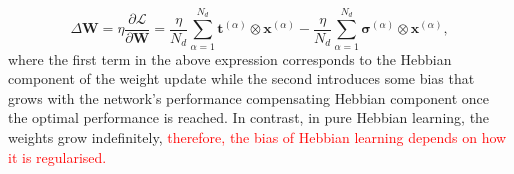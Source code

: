 \documentclass[a4paper, 11pt]{article}
\begin{document}
\begin{equation}
  \Delta\mathbf W = \eta\frac{\partial \mathcal L}{\partial \mathbf W} = \frac{\eta}{{N_d}}\sum_{\alpha=1}^{N_d}\mathbf t^{(\alpha)}\otimes\mathbf x^{(\alpha)} - \frac{\eta}{{N_d}}\sum_{\alpha=1}^{N_d}\boldsymbol\sigma^{(\alpha)}\otimes\mathbf x^{(\alpha)},
\end{equation}
where the first term in the above expression corresponds to the Hebbian component of the weight update while the second introduces some bias that grows with the network's performance compensating Hebbian component once the optimal performance is reached. In contrast, in pure Hebbian learning, the weights grow indefinitely, \textcolor{red}{therefore, the bias of Hebbian learning depends on how it is regularised.}


\end{document}
